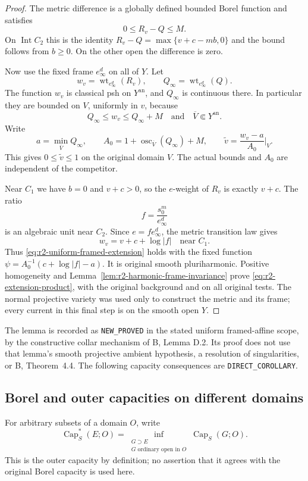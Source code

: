 \documentclass[11pt,a4paper]{article}
\numberwithin{equation}{section}
\theoremstyle{definition}
\theoremstyle{remark}
\begin{document}
\begin{proof}
The metric difference is a globally defined bounded Borel function
and satisfies
\[
 0\leq R_v-Q\leq M.
\]
On $\operatorname{Int}C_2$ this is the identity
$R_v-Q=\max\{v+c-mb,0\}$ and the bound follows from $b\geq0$.
On the other open the difference is zero.

Now use the fixed frame $e_\infty^d$ on all of $Y$. Let
\[
 w_v=\operatorname{wt}_{e_\infty^d}(R_v),\qquad
 Q_\infty=\operatorname{wt}_{e_\infty^d}(Q).
\]
The function $w_v$ is classical psh on $Y^{\mathrm{an}}$, and
$Q_\infty$ is continuous there. In particular they are bounded on
$V$, uniformly in $v$, because
\[
 Q_\infty\leq w_v\leq Q_\infty+M
 \quad\text{and}\quad\overline V\Subset Y^{\mathrm{an}}.
\]
Write
\[
 a=\min_{\overline V}Q_\infty,
 \qquad
 A_0=1+\operatorname{osc}_{\overline V}(Q_\infty)+M,
 \qquad
 \widetilde v=\frac{w_v-a}{A_0}\Big|_V.
\]
This gives $0\leq\widetilde v\leq1$ on the original domain $V$.
The actual bounds and $A_0$ are independent of the competitor.

Near $C_1$ we have $b=0$ and $v+c>0$, so the $e$-weight of $R_v$
is exactly $v+c$. The ratio
\[
 f=\frac{s_0^m}{e_\infty^d}
\]
is an algebraic unit near $C_2$. Since $e=f e_\infty^d$, the metric
transition law gives
\[
 w_v=v+c+\log|f|\quad\text{near }C_1.
\]
Thus \eqref{eq:r2-uniform-framed-extension} holds with the fixed
function
$\psi=A_0^{-1}(c+\log|f|-a)$. It is original smooth
pluriharmonic. Positive homogeneity and
Lemma~\ref{lem:r2-harmonic-frame-invariance} prove
\eqref{eq:r2-extension-product}, with the original background and on
all original tests. The normal projective variety was used only to
construct the metric and its frame; every current in this final step
is on the smooth open $Y$.
\end{proof}

The lemma is recorded as \texttt{NEW\_PROVED} in the stated uniform
framed-affine scope, by the constructive collar mechanism of
\textup{B}, Lemma D.2. Its proof does not use that lemma's smooth
projective ambient hypothesis, a resolution of singularities, or
\textup{B}, Theorem~4.4. The following capacity consequences are
\texttt{DIRECT\_COROLLARY}.

\subsection{Borel and outer capacities on different domains}

For arbitrary subsets of a domain $O$, write
\[
 \operatorname{Cap}_S^*(E;O)
   =\inf_{\substack{G\supset E\\G\text{ ordinary open in }O}}
                 \operatorname{Cap}_S(G;O).
\]
This is the outer capacity by definition; no assertion that it agrees
with the original Borel capacity is used here.
\end{document}
